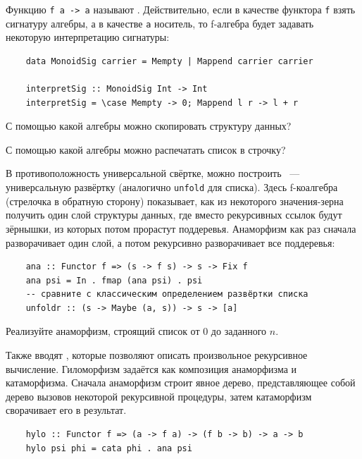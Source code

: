 Функцию \texttt{f a -> a} называют .
Действительно, если в качестве функтора \texttt{f} взять сигнатуру алгебры, а в качестве \texttt{a} носитель, то f-алгебра будет задавать некоторую интерпретацию сигнатуры:
\begin{verbatim}
    data MonoidSig carrier = Mempty | Mappend carrier carrier

    interpretSig :: MonoidSig Int -> Int
    interpretSig = \case Mempty -> 0; Mappend l r -> l + r
\end{verbatim}

\begin{task}
    С помощью какой алгебры можно скопировать структуру данных?
\end{task}

\begin{task}
    С помощью какой алгебры можно распечатать список в строчку?
\end{task}

В противоположность универсальной свёртке, можно построить ~--- универсальную развёртку (аналогично \texttt{unfold} для списка).
Здесь f-коалгебра (стрелочка в обратную сторону) показывает, как из некоторого значения-зерна получить один слой структуры данных, где вместо рекурсивных ссылок будут зёрнышки, из которых потом прорастут поддеревья.
Анаморфизм как раз сначала разворачивает один слой, а потом рекурсивно разворачивает все поддеревья:
\begin{verbatim}
    ana :: Functor f => (s -> f s) -> s -> Fix f
    ana psi = In . fmap (ana psi) . psi
    -- сравните с классическим определением развёртки списка
    unfoldr :: (s -> Maybe (a, s)) -> s -> [a]
\end{verbatim}

\begin{task}
    Реализуйте анаморфизм, строящий список от $0$ до заданного $n$.
\end{task}

Также вводят , которые позволяют описать произвольное рекурсивное вычисление.
Гиломорфизм задаётся как композиция анаморфизма и катаморфизма.
Сначала анаморфизм строит явное дерево, представляющее собой дерево вызовов некоторой рекурсивной процедуры, затем катаморфизм сворачивает его в результат.
\begin{verbatim}
    hylo :: Functor f => (a -> f a) -> (f b -> b) -> a -> b
    hylo psi phi = cata phi . ana psi
\end{verbatim}

